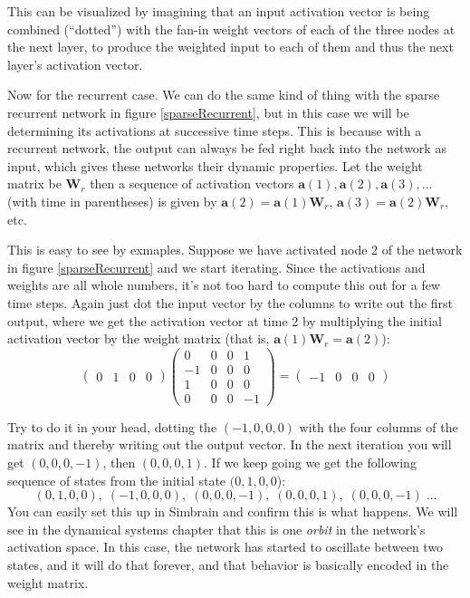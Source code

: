 This can be visualized by imagining that an input activation vector is being combined (``dotted'') with the fan-in weight vectors of each of the three nodes at the next layer, to produce the weighted input to each of them and thus the next layer's activation vector. 

Now for the recurrent case. We can do the same kind of thing with the sparse recurrent network in figure \ref{sparseRecurrent}, but in this case we will be determining its activations at successive time steps. This is because with a recurrent network, the output can always be fed right back into the network as input, which gives these networks their dynamic properties. Let the weight matrix be  $\textbf{W}_{r}$ then a sequence of activation vectors $\textbf{a}(1), \textbf{a}(2), \textbf{a}(3), \dots$ (with time in parentheses) is given by $\textbf{a}(2) = \textbf{a}(1) \textbf{W}_{r}$, $\textbf{a}(3) = \textbf{a}(2) \textbf{W}_{r}$, etc. 

This is easy to see by exmaples. Suppose we have activated node 2 of the network in figure \ref{sparseRecurrent} and we start iterating. Since the activations and weights are all whole numbers, it's not too hard to compute this out for a few time steps. Again just dot the input vector by the columns to write out the first output, where we get the activation vector at time 2 by multiplying the initial activation vector by the weight matrix (that is, $\textbf{a}(1) \textbf{W}_{r} = \textbf{a}(2)$):
\[
\begin{pmatrix}
0 & 1 & 0 & 0  
\end{pmatrix} 
\begin{pmatrix}
0 & 0 & 0 & 1 \\
-1 & 0 & 0 & 0 \\
1 & 0 & 0 & 0 \\
0 & 0 & 0 & -1
\end{pmatrix}
=
\begin{pmatrix}
-1 & 0 & 0 & 0
\end{pmatrix} 
\]
\vspace*{.1cm} 

\noindent Try to do it in your head, dotting the $(-1, 0,0,0)$ with the four columns of the matrix and thereby writing out the output vector. In the next iteration you will get $(0,0,0,-1)$, then $(0,0,0,1)$. If we keep going we get the following sequence of states from the initial state $(0,1,0,0$):
\begin{equation*}
(0,1,0,0),\; (-1,0,0,0),\; (0,0,0,-1),\; (0,0,0,1),\;  (0,0,0,-1)\; \dots
\end{equation*}
You can easily set this up in Simbrain and confirm this is what happens. We will see in the dynamical systems chapter  that this is one \emph{orbit} in the network's activation space. In this case, the network has started to oscillate between two states, and it will do that forever, and that behavior is basically encoded in the weight matrix.
 
